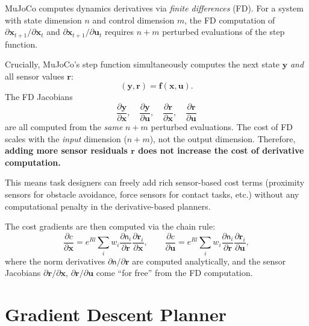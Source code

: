\documentclass[11pt,twoside]{report}
\theoremstyle{definition}
\theoremstyle{plain}
\theoremstyle{remark}
\newcommand{\x}{\bm{x}}
\newcommand{\uu}{\bm{u}}
\newcommand{\f}{\bm{f}}
\newcommand{\rr}{\bm{r}}
\newcommand{\0}{\bm{0}}
\begin{document}
\begin{insightbox}
MuJoCo computes dynamics derivatives via \emph{finite differences} (FD).
For a system with state dimension $n$ and control dimension $m$,
the FD computation of $\partial\x_{t+1}/\partial\x_{t}$ and
$\partial\x_{t+1}/\partial\uu_{t}$ requires $n+m$ perturbed evaluations
of the step function.

Crucially, MuJoCo's step function simultaneously computes
the next state $\bm{y}$ \emph{and} all sensor values $\rr$:
\begin{equation}
(\bm{y},\rr)=\f(\x,\uu).
\end{equation}
The FD Jacobians
\begin{equation}
\frac{\partial\bm{y}}{\partial\x},\quad
\frac{\partial\bm{y}}{\partial\uu},\quad
\frac{\partial\rr}{\partial\x},\quad
\frac{\partial\rr}{\partial\uu}
\end{equation}
are all computed from the \emph{same} $n+m$ perturbed evaluations.
The cost of FD scales with the \emph{input} dimension ($n+m$),
not the output dimension.  Therefore, \textbf{adding more sensor
residuals $\rr$ does not increase the cost of derivative computation.}
\end{insightbox}

This means task designers can freely add rich sensor-based cost terms
(proximity sensors for obstacle avoidance, force sensors for contact
tasks, etc.) without any computational penalty in the derivative-based
planners.

The cost gradients are then computed via the chain rule:
\begin{equation}
\frac{\partial c}{\partial\x}=e^{Rl}\sum_{i}w_{i}\frac{\partial\mathsf{n}_{i}}{\partial\rr}\frac{\partial\rr_{i}}{\partial\x},\qquad
\frac{\partial c}{\partial\uu}=e^{Rl}\sum_{i}w_{i}\frac{\partial\mathsf{n}_{i}}{\partial\rr}\frac{\partial\rr_{i}}{\partial\uu},
\end{equation}
where the norm derivatives $\partial\mathsf{n}/\partial\rr$ are computed
analytically, and the sensor Jacobians $\partial\rr/\partial\x$,
$\partial\rr/\partial\uu$ come ``for free'' from the FD computation.

\section{Gradient Descent Planner}
\end{document}
